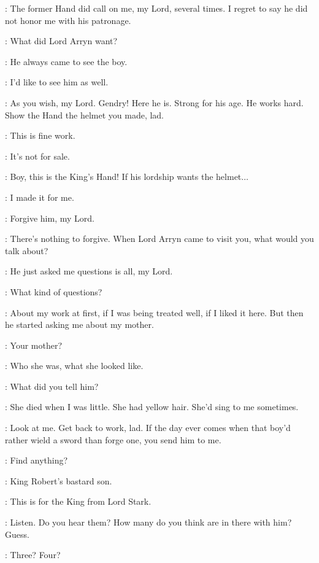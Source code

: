 \TOBHOMOTT: The former Hand did call on me, my Lord, several times. I regret to say he did not honor me with his patronage. 

\NED: What did Lord Arryn want? 

\TOBHOMOTT: He always came to see the boy. 

\NED: I'd like to see him as well. 

\TOBHOMOTT: As you wish, my Lord. Gendry! Here he is. Strong for his age. He works hard. Show the Hand the helmet you made, lad. 

\NED: This is fine work. 

\GENDRY: It's not for sale. 

\TOBHOMOTT: Boy, this is the King's Hand! If his lordship wants the helmet$\ldots$ 

\GENDRY: I made it for me. 

\TOBHOMOTT: Forgive him, my Lord. 

\NED: There's nothing to forgive. When Lord Arryn came to visit you, what would you talk about? 

\GENDRY: He just asked me questions is all, my Lord. 

\NED: What kind of questions? 

\GENDRY: About my work at first, if I was being treated well, if I liked it here. But then he started asking me about my mother. 

\NED: Your mother? 

\GENDRY: Who she was, what she looked like. 

\NED: What did you tell him? 

\GENDRY: She died when I was little. She had yellow hair. She'd sing to me sometimes. 

\NED: Look at me. Get back to work, lad. If the day ever comes when that boy'd rather wield a sword than forge one, you send him to me. 

\JORY: Find anything? 

\NED: King Robert's bastard son. 

\scene



\JORY: This is for the King from Lord Stark. 

\JAIME: Listen. Do you hear them? How many do you think are in there with him? Guess. 

\JORY: Three? Four? 

